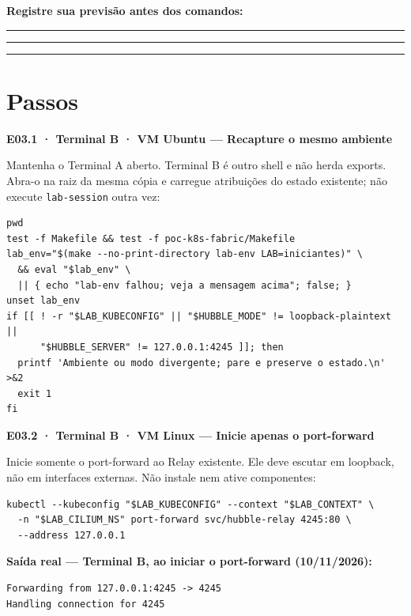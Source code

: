\documentclass[12pt,openany,oneside,a4paper,chapter=TITLE,english,brazil]{abntex2}
\begin{document}
\textbf{Registre sua previsão antes dos comandos:}

\noindent\rule{\textwidth}{0.35pt}\par\vspace{0.55cm}
\noindent\rule{\textwidth}{0.35pt}\par\vspace{0.55cm}
\noindent\rule{\textwidth}{0.35pt}

\clearpage

\section*{Passos}\label{passos-2}

\textbf{E03.1 · Terminal B · VM Ubuntu --- Recapture o mesmo ambiente}

Mantenha o Terminal A aberto. Terminal B é outro shell e não herda exports. Abra-o na raiz da mesma cópia e carregue atribuições do estado existente; não execute \texttt{lab-{}\allowbreak{}session} outra vez:

\begin{verbatim}
pwd
test -f Makefile && test -f poc-k8s-fabric/Makefile
lab_env="$(make --no-print-directory lab-env LAB=iniciantes)" \
  && eval "$lab_env" \
  || { echo "lab-env falhou; veja a mensagem acima"; false; }
unset lab_env
if [[ ! -r "$LAB_KUBECONFIG" || "$HUBBLE_MODE" != loopback-plaintext ||
      "$HUBBLE_SERVER" != 127.0.0.1:4245 ]]; then
  printf 'Ambiente ou modo divergente; pare e preserve o estado.\n' >&2
  exit 1
fi
\end{verbatim}

\textbf{E03.2 · Terminal B · VM Linux --- Inicie apenas o port-forward}

Inicie somente o port-forward ao Relay existente. Ele deve escutar em loopback, não em interfaces externas. Não instale nem ative componentes:

\begin{verbatim}
kubectl --kubeconfig "$LAB_KUBECONFIG" --context "$LAB_CONTEXT" \
  -n "$LAB_CILIUM_NS" port-forward svc/hubble-relay 4245:80 \
  --address 127.0.0.1
\end{verbatim}

\textbf{Saída real --- Terminal B, ao iniciar o port-forward (10/11/2026):}

\begin{verbatim}
Forwarding from 127.0.0.1:4245 -> 4245
Handling connection for 4245
\end{verbatim}
\end{document}
